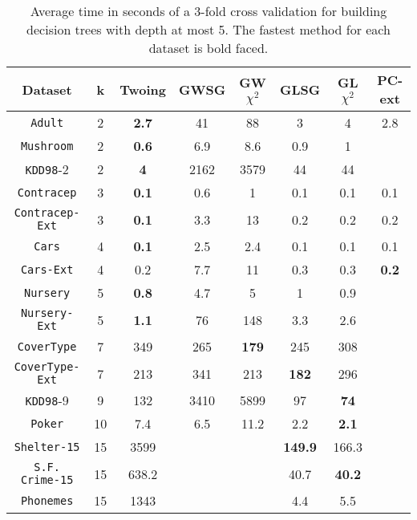 \begin{table*}[]
\small
\centering
\caption{Average time in seconds of a 3-fold cross validation
for building decision trees with depth at most 5.
The fastest method for each dataset is bold faced.}
\begin{tabular}{c|c|c|c|c|c|c|c}
Dataset             & k  & Twoing    & GWSG  & GW$\chi^2$ & GLSG      & GL$\chi^2$ & PC-ext     \\ \hline
{\tt Adult}         & 2  & {\bf  2.7} & 41   & 88         & 3         & 4          & 2.8        \\
{\tt Mushroom}      & 2  & {\bf 0.6} & 6.9  & 8.6         & 0.9       & 1          &            \\
{\tt KDD98}-2       & 2  & {\bf 4}   & 2162 & 3579        & 44        & 44         &            \\
{\tt Contracep}     & 3  & {\bf 0.1} & 0.6  & 1           & 0.1       & 0.1        & 0.1        \\
{\tt Contracep-Ext} & 3  & {\bf 0.1} & 3.3  & 13          & 0.2       & 0.2        & 0.2        \\
{\tt Cars}          & 4  & {\bf 0.1} & 2.5  & 2.4         & 0.1       & 0.1        & 0.1        \\
{\tt Cars-Ext}      & 4  & 0.2       & 7.7  & 11          & 0.3       & 0.3        & {\bf 0.2}  \\
{\tt Nursery}       & 5  & {\bf 0.8} & 4.7  & 5           & 1         & 0.9        &            \\
{\tt Nursery-Ext}   & 5  & {\bf 1.1} & 76   & 148         & 3.3       & 2.6        &            \\
{\tt CoverType}     & 7  & 349       & 265  & {\bf 179}   & 245       & 308        &            \\
{\tt CoverType-Ext} & 7  & 213       & 341  & 213         & {\bf 182} & 296        &            \\
{\tt KDD98}-9       & 9  & 132       & 3410 & 5899        & 97        & {\bf 74}   &            \\ 
{\tt Poker}         & 10 & 7.4       & 6.5  & 11.2        & 2.2       & {\bf 2.1}  &            \\
{\tt Shelter-15}    & 15 & 3599      &      &             & {\bf149.9}& 166.3      &            \\   
{\tt S.F. Crime-15} & 15 & 638.2     &      &             & 40.7      & {\bf 40.2} &            \\ 
{\tt Phonemes}      & 15 & 1343      &      &             &      4.4  & 5.5        &       
\end{tabular}
\label{tab:time}
\end{table*}



